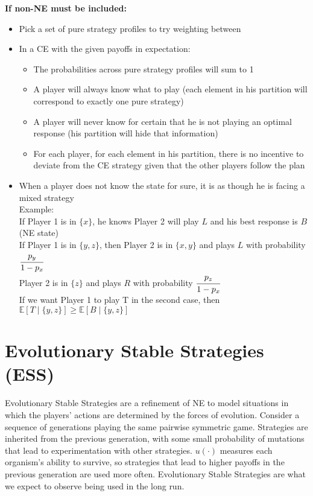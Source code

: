 \documentclass{report}
\newcommand{\FlowerSmall}{\mbox{\raisebox{-1pt}{\small\EightFlowerPetalRemoved}}} %
\begin{document}
\begin{mdframed}
	\bigskip
	\textbf{If non-NE must be included:}
	\begin{itemize}[label=\FlowerSmall]
		\item{Pick a set of pure strategy profiles to try weighting between}
		\item{In a CE with the given payoffs in expectation:}
			\begin{itemize}
			\item{The probabilities across pure strategy profiles will sum to 1}
			\item{A player will always know what to play (each element in his partition will correspond to exactly one pure strategy)}
			\item{A player will never know for certain that he is not playing an optimal response (his partition will hide that information)}
			\item{For each player, for each element in his partition, there is no incentive to deviate from the CE strategy given that the other players follow the plan}
			\end{itemize}
	\item{When a player does not know the state for sure, it is as though he is facing a mixed strategy\\[5pt]
	Example:\\[5pt]
	If Player 1 is in $\{x\}$, he knows Player 2 will play $L$ and his best response is $B$ (NE state)\\[5pt]
	If Player 1 is in $\{y,z\}$, then Player 2 is in $\{x,y\}$ and plays $L$ with probability $\cfrac{p_y}{1 - p_x}$\\
	\hspace*{121pt} Player 2 is in $\{z\}$ and plays $R$ with probability $\cfrac{p_z}{1 - p_x}$\\[5pt]
	If we want Player 1 to play T in the second case, then $\mathbb{E}[T \mid \{y,z\}] \geq \mathbb{E}[B \mid \{y,z\}]$ 
	}
	\end{itemize}
\smallskip
\end{mdframed}

\section*{Evolutionary Stable Strategies (ESS)}\medskip

Evolutionary Stable Strategies are a refinement of NE to model situations in which the players' actions are determined by the forces of evolution. Consider a sequence of generations playing the same pairwise symmetric game. Strategies are inherited from the previous generation, with some small probability of mutations that lead to experimentation with other strategies. $u(\cdot)$ measures each organism's ability to survive, so strategies that lead to higher payoffs in the previous generation are used more often. Evolutionary Stable Strategies are what we expect to observe being used in the long run. \bigskip
\end{document}

